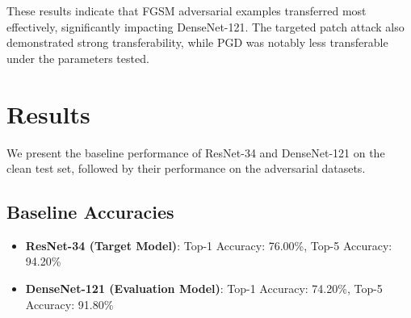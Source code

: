 \documentclass[letterpaper]{article}
\begin{document}
\begin{table}[h!]
\centering
\caption{Transferability Results (crafted on ResNet-34)}
\label{tab:transferability_results}
\end{table}

These results indicate that FGSM adversarial examples transferred most effectively, significantly impacting DenseNet-121. The targeted patch attack also demonstrated strong transferability, while PGD was notably less transferable under the parameters tested.


\section{Results}
We present the baseline performance of ResNet-34 and DenseNet-121 on the clean test set, followed by their performance on the adversarial datasets.

\subsection{Baseline Accuracies}
\begin{itemize}
    \item \textbf{ResNet-34 (Target Model)}: Top-1 Accuracy: 76.00\%, Top-5 Accuracy: 94.20\%
    \item \textbf{DenseNet-121 (Evaluation Model)}: Top-1 Accuracy: 74.20\%, Top-5 Accuracy: 91.80\%
\end{itemize}
\end{document}

